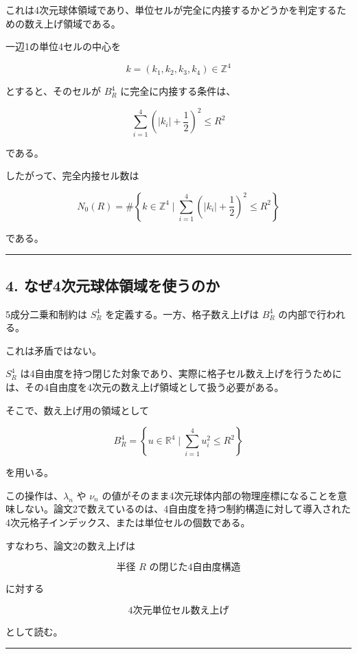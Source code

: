 \documentclass[
]{ltjsarticle}
\begin{document}
これは4次元球体領域であり、単位セルが完全に内接するかどうかを判定するための数え上げ領域である。

一辺1の単位4セルの中心を

\[
k=(k_1,k_2,k_3,k_4)\in\mathbb{Z}^4
\]

とすると、そのセルが \(B^4_R\) に完全に内接する条件は、

\[
\sum_{i=1}^{4}
\left(|k_i|+\frac12\right)^2
\le R^2
\]

である。

したがって、完全内接セル数は

\[
N_0(R)
=
\#\left\{
k\in\mathbb{Z}^4
\mid
\sum_{i=1}^{4}
\left(|k_i|+\frac12\right)^2
\le R^2
\right\}
\]

である。

\begin{center}\rule{0.5\linewidth}{0.5pt}\end{center}

\subsection{4.
なぜ4次元球体領域を使うのか}\label{ux306aux305c4ux6b21ux5143ux7403ux4f53ux9818ux57dfux3092ux4f7fux3046ux306eux304b}

5成分二乗和制約は \(S^4_R\) を定義する。一方、格子数え上げは \(B^4_R\)
の内部で行われる。

これは矛盾ではない。

\(S^4_R\)
は4自由度を持つ閉じた対象であり、実際に格子セル数え上げを行うためには、その4自由度を4次元の数え上げ領域として扱う必要がある。

そこで、数え上げ用の領域として

\[
B^4_R
=
\left\{
u\in\mathbb{R}^4
\mid
\sum_{i=1}^{4}u_i^2\le R^2
\right\}
\]

を用いる。

この操作は、\(\lambda_n\) や \(\nu_n\)
の値がそのまま4次元球体内部の物理座標になることを意味しない。論文2で数えているのは、4自由度を持つ制約構造に対して導入された4次元格子インデックス、または単位セルの個数である。

すなわち、論文2の数え上げは

\[
\text{半径 }R\text{ の閉じた4自由度構造}
\]

に対する

\[
\text{4次元単位セル数え上げ}
\]

として読む。

\begin{center}\rule{0.5\linewidth}{0.5pt}\end{center}
\end{document}
